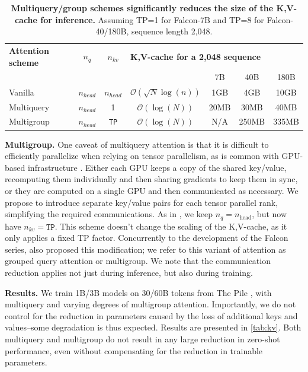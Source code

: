 \documentclass{article}
\DeclareRobustCommand{\hardware}[1]{\textcolor{Mahogany}{#1}}
\begin{document}
\begin{table}[t]
\begin{center}
\caption{\textbf{\hardware{Multiquery/group schemes significantly reduces the size of the K,V-cache for inference.}} Assuming TP=1 for Falcon-7B and TP=8 for Falcon-40/180B, sequence length 2,048.} 
\label{tab:multiquery}
\begin{tabular}{lcccccc}
\toprule
\textbf{Attention scheme} &  $n_{q}$ & $n_{kv}$ & \multicolumn{4}{l}{\textbf{K,V-cache for a 2,048 sequence}}\\
& & &  & 7B & 40B & 180B \\
\midrule
Vanilla & $n_{head}$ & $n_{head}$ & $\mathcal{O}(\sqrt{N}\log(n))$ & 1GB & 4GB & 10GB \\
Multiquery \citep{multiquery} & $n_{head}$ & 1 & $\mathcal{O}(\log(N))$ & 20MB & 30MB & 40MB \\
Multigroup \citep{grouped-query-attn} & $n_{head}$ & \texttt{TP} & $\mathcal{O}(\log(N))$ & N/A & 250MB & 335MB \\
\bottomrule
\end{tabular}
\end{center}
\end{table}

\textbf{Multigroup.} One caveat of multiquery attention is that it is difficult to efficiently parallelize when relying on tensor parallelism, as is common with GPU-based infrastructure \citep{megatron-1}. Either each GPU keeps a copy of the shared key/value, recomputing them individually and then sharing gradients to keep them in sync, or they are computed on a single GPU and then communicated as necessary. We propose to introduce separate key/value pairs for each tensor parallel rank, simplifying the required communications. As in \citet{multiquery}, we keep $n_{q} = n_{\text{head}}$, but now have $n_{kv}=\texttt{TP}$. This scheme doesn't change the scaling of the K,V-cache, as it only applies a fixed TP factor. Concurrently to the development of the Falcon series, \citet{grouped-query-attn} also proposed this modification; we refer to this variant of attention as grouped query attention or multigroup. We note that the communication reduction applies not just during inference, but also during training.

\textbf{Results.} We train 1B/3B models on 30/60B tokens from The Pile \citep{gao2020pile}, with multiquery and varying degrees of multigroup attention. Importantly, we do not control for the reduction in parameters caused by the loss of additional keys and values--some degradation is thus expected. Results are presented in \cref{tab:kv}. Both multiquery and multigroup do not result in any large reduction in zero-shot performance, even without compensating for the reduction in trainable parameters.
\end{document}
